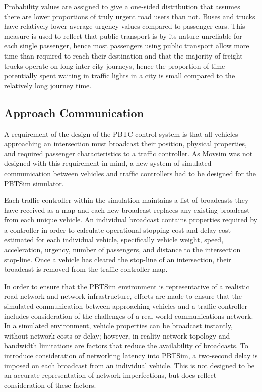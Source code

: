 Probability values are assigned to give a one-sided distribution that assumes there are lower proportions of truly urgent road users than not. Buses and trucks have relatively lower average urgency values compared to passenger cars. This measure is used to reflect that public transport is by its nature unreliable for each single passenger, hence most passengers using public transport allow more time than required to reach their destination and that the majority of freight trucks operate on long inter-city journeys, hence the proportion of time potentially spent waiting in traffic lights in a city is small compared to the relatively long journey time.

\subsection{Approach Communication}

A requirement of the design of the PBTC control system is that all vehicles approaching an intersection must broadcast their position, physical properties, and required passenger characteristics to a traffic controller. As Movsim was not designed with this requirement in mind, a new system of simulated communication between vehicles and traffic controllers had to be designed for the PBTSim simulator.

Each traffic controller within the simulation maintains a list of broadcasts they have received as a map and each new broadcast replaces any existing broadcast from each unique vehicle. An individual broadcast contains properties required by a controller in order to calculate operational stopping cost and delay cost estimated for each individual vehicle, specifically vehicle weight, speed, acceleration, urgency, number of passengers, and distance to the intersection stop-line. Once a vehicle has cleared the stop-line of an intersection, their broadcast is removed from the traffic controller map.

In order to ensure that the PBTSim environment is representative of a realistic road network and network infrastructure, efforts are made to ensure that the simulated communication between approaching vehicles and a traffic controller includes consideration of the challenges of a real-world communications network. In a simulated environment, vehicle properties can be broadcast instantly, without network costs or delay; however, in reality network topology and bandwidth limitations are factors that reduce the availability of broadcasts. To introduce consideration of networking latency into PBTSim, a two-second delay is imposed on each broadcast from an individual vehicle. This is not designed to be an accurate representation of network imperfections, but does reflect consideration of these factors.

